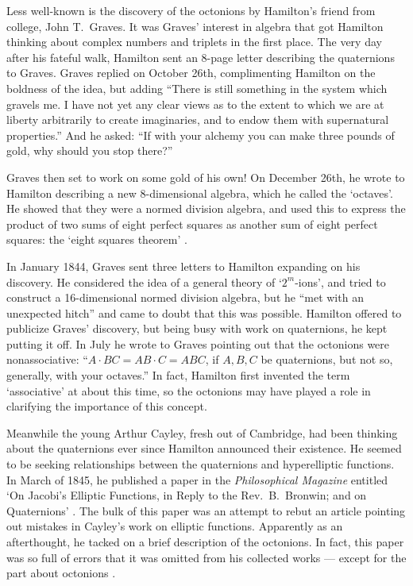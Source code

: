 \documentclass[12pt]{article}
\begin{document}
Less well-known is the discovery of the octonions by Hamilton's friend   
from college, John T.\ Graves.  It was Graves' interest in algebra that   
got Hamilton thinking about complex numbers and triplets in the first    
place.  The very day after his fateful walk, Hamilton sent an 8-page   
letter describing the quaternions to Graves.  Graves replied on October   
26th, complimenting Hamilton on the boldness of the idea, but adding   
``There is still something in the system which gravels me.  I have not   
yet any clear views as to the extent to which we are at liberty   
arbitrarily to create imaginaries, and to endow them with supernatural   
properties.''  And he asked: ``If with your alchemy you can make three   
pounds of gold, why should you stop there?''  

Graves then set to work on some gold of his own!  On December 26th,
he wrote to Hamilton describing a new 8-dimensional algebra, which he
called the `octaves'.   He showed that they were a normed division
algebra, and used this to express the product of two sums of eight
perfect squares as another sum of eight perfect squares: the `eight
squares theorem' \cite{Hamilton}. 

In January 1844, Graves sent three letters to Hamilton expanding on his   
discovery.  He considered the idea of a general theory of   
`$2^m$-ions', and tried to construct a 16-dimensional normed division   
algebra, but he ``met with an unexpected hitch'' and came to doubt that   
this was possible.  Hamilton offered to publicize Graves' discovery, but   
being busy with work on quaternions, he kept putting it off.  In July he   
wrote to Graves pointing out that the octonions were nonassociative:   
``$A \cdot BC = AB \cdot C = ABC$, if $A,B,C$ be quaternions, but not   
so, generally, with your octaves.''  In fact, Hamilton first invented   
the term `associative' at about this time, so the octonions may have   
played a role in clarifying the importance of this concept.    
   
Meanwhile the young Arthur Cayley, fresh out of Cambridge, had been
thinking about the quaternions ever since Hamilton announced their
existence.  He seemed to be seeking relationships between the
quaternions and hyperelliptic functions.  In March of 1845, he published
a paper in the {\it Philosophical Magazine} entitled `On Jacobi's
Elliptic Functions, in Reply to the Rev.\ B.\ Bronwin; and on Quaternions'
\cite{Cayley}.  The bulk of this paper was an attempt to rebut an
article pointing out mistakes in Cayley's work on elliptic functions.
Apparently as an afterthought, he tacked on a brief description of the
octonions.  In fact, this paper was so full of errors that it was 
omitted from his collected works --- except for the part about octonions
\cite{Cayley2}.
\end{document}
